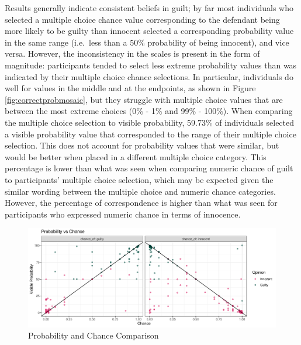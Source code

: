\documentclass[print]{nuthesis}
\begin{document}
Results generally indicate consistent beliefs in guilt; by far most individuals who selected a multiple choice chance value corresponding to the defendant being more likely to be guilty than innocent selected a corresponding probability value in the same range (i.e.~less than a 50\% probability of being innocent), and vice versa.
However, the inconsistency in the scales is present in the form of magnitude: participants tended to select less extreme probability values than was indicated by their multiple choice chance selections.
In particular, individuals do well for values in the middle and at the endpoints, as shown in Figure \ref{fig:correctprobmosaic}, but they struggle with multiple choice values that are between the most extreme choices (0\% - 1\% and 99\% - 100\%). When comparing the multiple choice selection to visible probability, 59.73\% of individuals selected a visible probability value that corresponded to the range of their multiple choice selection.
This does not account for probability values that were similar, but would be better when placed in a different multiple choice category.
This percentage is lower than what was seen when comparing numeric chance of guilt to participants' multiple choice selection, which may be expected given the similar wording between the multiple choice and numeric chance categories.
However, the percentage of correspondence is higher than what was seen for participants who expressed numeric chance in terms of innocence.

\begin{figure}

{\centering \includegraphics[width=\linewidth]{thesis_files/figure-latex/likeprobcon-1} 

}

\caption{Probability and Chance Comparison}\label{fig:likeprobcon}
\end{figure}
\end{document}
